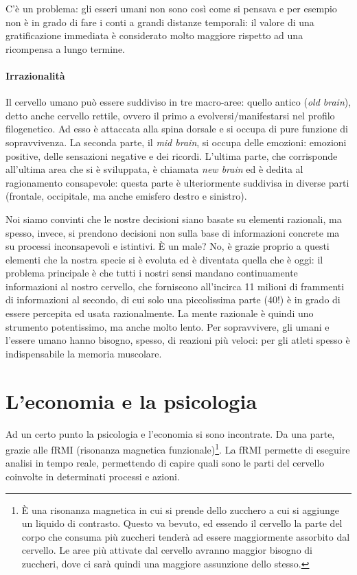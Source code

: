 C'è un problema: gli esseri umani non sono così come si pensava e per esempio
non è in grado di fare i conti a grandi distanze temporali: il valore di una
gratificazione immediata è considerato molto maggiore rispetto ad una
ricompensa a lungo termine.

\paragraph*{Irrazionalità} 
Il cervello umano può essere suddiviso in tre macro-aree: quello
antico (\textit{old brain}), detto anche cervello rettile, ovvero il primo a
evolversi/manifestarsi nel profilo filogenetico. Ad esso è attaccata alla
spina dorsale e si occupa di pure funzione di sopravvivenza.
La seconda parte, il \textit{mid brain}, si occupa delle emozioni: emozioni
positive, delle sensazioni negative e dei ricordi.
L'ultima parte, che corrisponde all'ultima area che si è sviluppata, è chiamata
\textit{new brain} ed è dedita al ragionamento consapevole: questa parte è
ulteriormente suddivisa in diverse parti (frontale, occipitale, ma anche
emisfero destro e sinistro).

Noi siamo convinti che le nostre decisioni siano basate su elementi razionali,
ma spesso, invece, si prendono decisioni non sulla base di informazioni
concrete ma su processi inconsapevoli e istintivi.
È un male? No, è grazie proprio a questi elementi che la nostra specie si è
evoluta ed è diventata quella che è oggi: il problema principale è che tutti i
nostri sensi mandano continuamente informazioni al nostro cervello, che
forniscono all'incirca 11 milioni di frammenti di informazioni al secondo, di
cui solo una piccolissima parte (40!) è in grado di essere percepita ed usata
razionalmente. La mente razionale è quindi uno strumento potentissimo, ma anche
molto lento. Per sopravvivere, gli umani e l'essere umano hanno
bisogno, spesso, di reazioni più veloci: per gli atleti spesso è indispensabile
la memoria muscolare.

\section{L'economia e la psicologia}

Ad un certo punto la psicologia e l'economia si sono incontrate.
Da una parte, grazie alle fRMI (risonanza magnetica funzionale)\footnote{È una
risonanza magnetica in cui si prende dello zucchero a cui si aggiunge un
liquido di contrasto. Questo va bevuto, ed essendo il cervello la parte del
corpo che consuma più zuccheri tenderà ad essere maggiormente assorbito dal
cervello. Le aree più attivate dal cervello avranno maggior bisogno di
zuccheri, dove ci sarà quindi una maggiore assunzione dello stesso.}. La fRMI
permette di eseguire analisi in tempo reale, permettendo di capire quali sono
le parti del cervello coinvolte in determinati processi e azioni.

